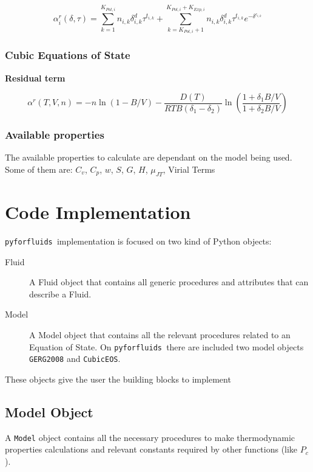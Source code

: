 \documentclass[a0,portrait]{a0poster}
\newcommand{\pff}{\texttt{pyforfluids }}
\begin{document}
\begin{multicols}{2}
\begin{equation}
    \label{eq:residual_pure}
    \alpha^r_i(\delta, \tau) = \sum_{k=1}^{K_{Pol,i}} n_{i,k}\delta^d_{i,k} \tau^{t_{i,k}} +
    \sum_{k=K_{Pol,i}+1}^{K_{Pol,i}+K_{Exp,i}} n_{i,k} \delta^d_{i,k}\tau^{t_{i,k}}e^{-\delta^{c_{i,k}}}
\end{equation}

\subsubsection*{Cubic Equations of State}
\textbf{Residual term} 

\begin{equation}
    \alpha^r(T, V, n) = -n \ln(1 - B/V) - \frac{D(T)}{RTB(\delta_1 - \delta_2)}\ln\left(\frac{1+\delta_1 B/V}{1+\delta_2 B/V}\right)
\end{equation}

\subsubsection*{Available properties}
The available properties to calculate are dependant on the model being used.
Some of them are: $C_v$, $C_p$, $w$, $S$, $G$, $H$, $\mu_{JT}$, Virial Terms

\section*{Code Implementation}

\pff implementation is focused on two kind of Python objects:

\begin{description}
    \item[Fluid] A Fluid object that contains all generic procedures and
	attributes that can describe a Fluid.
    \item[Model] A Model object that contains all the relevant procedures
	related to an Equation of State. On \pff there are included two model
	objects \texttt{GERG2008} and \texttt{CubicEOS}.
\end{description}

These objects give the user the building blocks to implement 

\subsection*{Model Object}
A \texttt{Model} object contains all the necessary procedures to make
thermodynamic properties calculations and relevant constants required by
other functions (like $P_c$).\\


\end{multicols}
\end{document}
